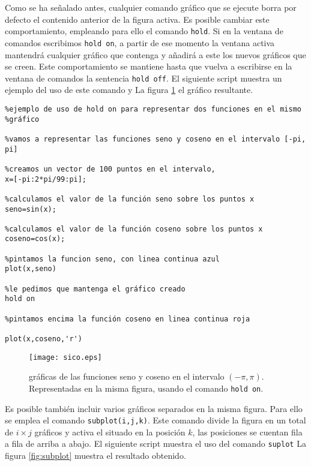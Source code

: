 Como se ha señalado antes, cualquier comando gráfico que se ejecute borra por defecto el contenido anterior de la figura activa. Es posible cambiar este comportamiento, empleando para ello el comando \texttt{hold}. Si en la ventana de comandos escribimos \texttt{hold on}, a partir de ese momento la ventana activa mantendrá cualquier gráfico que contenga y añadirá a este los nuevos gráficos que se creen. Este comportamiento se mantiene hasta que vuelva a escribirse en la ventana de comandos la sentencia \texttt{hold off}. El siguiente script muestra un ejemplo del uso de este comando y La figura \ref{fig:sico} el gráfico resultante.

\begin{verbatim}
%ejemplo de uso de hold on para representar dos funciones en el mismo
%gráfico

%vamos a representar las funciones seno y coseno en el intervalo [-pi, pi]

%creamos un vector de 100 puntos en el intervalo,
x=[-pi:2*pi/99:pi];

%calculamos el valor de la función seno sobre los puntos x
seno=sin(x);

%calculamos el valor de la función coseno sobre los puntos x
coseno=cos(x);

%pintamos la funcion seno, con linea continua azul
plot(x,seno)

%le pedimos que mantenga el gráfico creado
hold on

%pintamos encima la función coseno en linea continua roja

plot(x,coseno,'r')

\end{verbatim}


\begin{figure}[h]
\centering
\texttt{[image: sico.eps]}
\caption{gráficas de las funciones seno y coseno en el intervalo $(-\pi, \pi)$. Representadas en la misma figura, usando el comando \texttt{hold on}.}
\label{fig:sico}
\end{figure}

Es posible también incluir varios gráficos separados en la misma figura. 
Para ello se emplea el comando \texttt{subplot(i,j,k)}. Este comando divide la figura en un total de $i\times j$ gráficos y activa el situado en la posición $k$, las posiciones se cuentan fila a fila de arriba a abajo. El siguiente script muestra el uso del comando \texttt{suplot} La figura \ref{fig:subplot} muestra el resultado obtenido.


